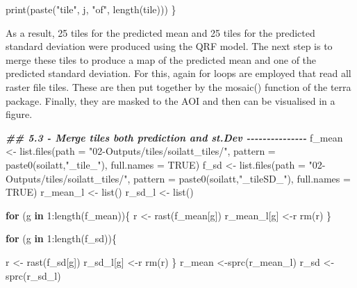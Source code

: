 \documentclass[
  10pt,
  b5paper,
  oneside]{book}
\newenvironment{Shaded}{\begin{snugshade}}{\end{snugshade}}
\newcommand{\AttributeTok}[1]{\textcolor[rgb]{0.77,0.63,0.00}{#1}}
\newcommand{\ConstantTok}[1]{\textcolor[rgb]{0.00,0.00,0.00}{#1}}
\newcommand{\ControlFlowTok}[1]{\textcolor[rgb]{0.13,0.29,0.53}{\textbf{#1}}}
\newcommand{\DecValTok}[1]{\textcolor[rgb]{0.00,0.00,0.81}{#1}}
\newcommand{\DocumentationTok}[1]{\textcolor[rgb]{0.56,0.35,0.01}{\textbf{\textit{#1}}}}
\newcommand{\FunctionTok}[1]{\textcolor[rgb]{0.00,0.00,0.00}{#1}}
\newcommand{\NormalTok}[1]{#1}
\newcommand{\OtherTok}[1]{\textcolor[rgb]{0.56,0.35,0.01}{#1}}
\newcommand{\SpecialCharTok}[1]{\textcolor[rgb]{0.00,0.00,0.00}{#1}}
\newcommand{\StringTok}[1]{\textcolor[rgb]{0.31,0.60,0.02}{#1}}
\begin{document}
\begin{Shaded}
\begin{Highlighting}[]
    \FunctionTok{print}\NormalTok{(}\FunctionTok{paste}\NormalTok{(}\StringTok{"tile"}\NormalTok{, j, }\StringTok{"of"}\NormalTok{, }\FunctionTok{length}\NormalTok{(tile)))}
\NormalTok{  \}}
\end{Highlighting}
\end{Shaded}

As a result, 25 tiles for the predicted mean and 25 tiles for the predicted standard deviation were produced using the QRF model. The next step is to merge these tiles to produce a map of the predicted mean and one of the predicted standard deviation. For this, again for loops are employed that read all raster file tiles. These are then put together by the mosaic() function of the terra package. Finally, they are masked to the AOI and then can be visualised in a figure.

\begin{Shaded}
\begin{Highlighting}[]
  \DocumentationTok{\#\# 5.3 {-} Merge tiles both prediction and st.Dev {-}{-}{-}{-}{-}{-}{-}{-}{-}{-}{-}{-}{-}{-}{-}}
\NormalTok{  f\_mean }\OtherTok{\textless{}{-}} \FunctionTok{list.files}\NormalTok{(}\AttributeTok{path =} \StringTok{"02{-}Outputs/tiles/soilatt\_tiles/"}\NormalTok{, }
          \AttributeTok{pattern =} \FunctionTok{paste0}\NormalTok{(soilatt,}\StringTok{"\_tile\_"}\NormalTok{), }\AttributeTok{full.names =} \ConstantTok{TRUE}\NormalTok{)}
\NormalTok{  f\_sd }\OtherTok{\textless{}{-}} \FunctionTok{list.files}\NormalTok{(}\AttributeTok{path =} \StringTok{"02{-}Outputs/tiles/soilatt\_tiles/"}\NormalTok{, }
       \AttributeTok{pattern =}  \FunctionTok{paste0}\NormalTok{(soilatt,}\StringTok{"\_tileSD\_"}\NormalTok{), }\AttributeTok{full.names =} \ConstantTok{TRUE}\NormalTok{)}
\NormalTok{  r\_mean\_l }\OtherTok{\textless{}{-}} \FunctionTok{list}\NormalTok{()}
\NormalTok{  r\_sd\_l }\OtherTok{\textless{}{-}} \FunctionTok{list}\NormalTok{()}
  
  \ControlFlowTok{for}\NormalTok{ (g }\ControlFlowTok{in} \DecValTok{1}\SpecialCharTok{:}\FunctionTok{length}\NormalTok{(f\_mean))\{}
\NormalTok{    r }\OtherTok{\textless{}{-}} \FunctionTok{rast}\NormalTok{(f\_mean[g])}
\NormalTok{    r\_mean\_l[g] }\OtherTok{\textless{}{-}}\NormalTok{r}
    \FunctionTok{rm}\NormalTok{(r)}
\NormalTok{  \}}
  
  \ControlFlowTok{for}\NormalTok{ (g }\ControlFlowTok{in} \DecValTok{1}\SpecialCharTok{:}\FunctionTok{length}\NormalTok{(f\_sd))\{}
    
\NormalTok{    r }\OtherTok{\textless{}{-}} \FunctionTok{rast}\NormalTok{(f\_sd[g])}
\NormalTok{    r\_sd\_l[g] }\OtherTok{\textless{}{-}}\NormalTok{r}
    \FunctionTok{rm}\NormalTok{(r)}
\NormalTok{  \}}
\NormalTok{  r\_mean }\OtherTok{\textless{}{-}}\FunctionTok{sprc}\NormalTok{(r\_mean\_l)}
\NormalTok{  r\_sd }\OtherTok{\textless{}{-}}\FunctionTok{sprc}\NormalTok{(r\_sd\_l)}
  

\end{Highlighting}
\end{Shaded}
\end{document}
